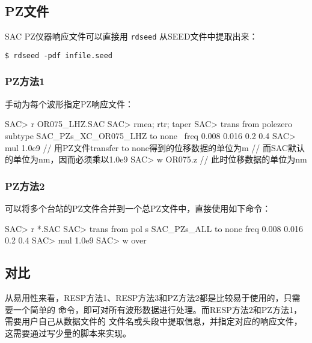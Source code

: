 \subsection{PZ文件}
SAC PZ仪器响应文件可以直接用 \texttt{rdseed} 从SEED文件中提取出来：
\begin{verbatim}
$ rdseed -pdf infile.seed
\end{verbatim}

\subsubsection{PZ方法1}
手动为每个波形指定PZ响应文件：
\begin{SACCode}
SAC> r OR075_LHZ.SAC
SAC> rmea; rtr; taper
SAC> trans from polezero subtype SAC_PZs_XC_OR075_LHZ to none \
                        freq 0.008 0.016 0.2 0.4
SAC> mul 1.0e9      // 用PZ文件transfer to none得到的位移数据的单位为m
                    // 而SAC默认的单位为nm，因而必须乘以1.0e9
SAC> w OR075.z      // 此时位移数据的单位为nm
\end{SACCode}

\subsubsection{PZ方法2}
可以将多个台站的PZ文件合并到一个总PZ文件中，直接使用如下命令：
\begin{SACCode}
SAC> r *.SAC
SAC> trans from pol s SAC_PZs_ALL to none freq 0.008 0.016 0.2 0.4
SAC> mul 1.0e9
SAC> w over
\end{SACCode}

\subsection{对比}
从易用性来看，RESP方法1、RESP方法3和PZ方法2都是比较易于使用的，只需要一个简单的
命令，即可对所有波形数据进行处理。而RESP方法2和PZ方法1，需要用户自己从数据文件的
文件名或头段中提取信息，并指定对应的响应文件，这需要通过写少量的脚本来实现。

